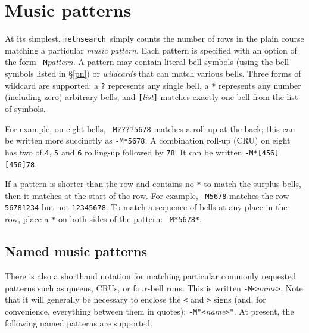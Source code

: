 \documentclass[a4paper,11pt,oneside]{book}
\def\textitidx#1{\textit{#1}\index{#1}}
\def\methsearch{\texttt{meth\-search}}
\newcommand{\sref}[1]{\hyperref[#1]{\S\ref{#1}}}
\begin{document}
\section{Music patterns}\label{muspattern}

At its simplest, \methsearch\ simply counts the number of rows in
the plain course matching a particular \textitidx{music pattern}.  
Each pattern is specified with an option of the form 
\verb+-M+\textit{pattern}.  A pattern may contain literal bell symbols 
(using the bell symbols listed in \sref{pn}) or \textitidx{wildcards} that 
can match various bells.  Three forms of wildcard are supported:
a \verb+?+ represents any single bell, a \verb+*+ represents any number
(including zero) arbitrary bells, and \verb+[+\textit{list}\verb+]+ matches
exactly one bell from the list of symbols.

For example, on eight bells, \verb+-M????5678+ matches a roll-up 
at the back; this can be written more succinctly as \verb+-M*5678+.  A 
combination roll-up (CRU)%
 on eight
has two of \verb+4+, \verb+5+ and \verb+6+ rolling-up followed by \verb+78+.
It can be written \verb+-M*[456][456]78+.

If a pattern is shorter than the row and contains no \verb+*+ to match the
surplus bells, then it matches at the start of the row.  For example,
\verb+-M5678+ matches the row \verb+56781234+ but not \verb+12345678+.  To
match a sequence of bells at any place in the row, place a \verb+*+ on
both sides of the pattern: \verb+-M*5678*+.

\subsection{Named music patterns}\label{musnamed}

There is also a shorthand notation for matching particular commonly requested
patterns such as queens, CRUs, or four-bell runs.  This is written
\verb+-M<+\textit{name}\verb+>+.  Note that it will generally be necessary to 
enclose the \verb+<+ and \verb+>+ signs (and, for convenience, everything 
between them in quotes): \verb+-M"<+\textit{name}\verb+>"+.%
At present, the following named patterns are supported.
\end{document}
